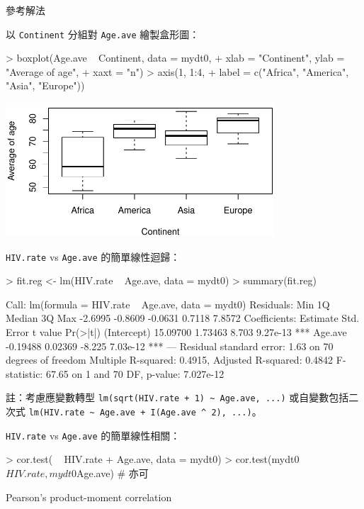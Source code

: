 \documentclass[14pt, aspectratio=43]{beamer}
\begin{document}
\begin{frame}{參考解法}
\framebreak

以 \verb+Continent+ 分組對 \verb+Age.ave+ 繪製盒形圖：
\begin{RC}
> boxplot(Age.ave ~ Continent, data = mydt0,
+         xlab = "Continent", ylab = "Average of age",
+         xaxt = "n")
> axis(1, 1:4, 
+      label = c("Africa", "America", "Asia", "Europe"))
\end{RC}
\begin{center}\includegraphics[width=0.75\textwidth]{Rplot-test-anova.pdf}\end{center}

\verb+HIV.rate+ vs \verb+Age.ave+ 的簡單線性迴歸：
\begin{RC}
> fit.reg <- lm(HIV.rate ~ Age.ave, data = mydt0)
> summary(fit.reg)
\end{RC}
\begin{R}
Call:
lm(formula = HIV.rate ~ Age.ave, data = mydt0)
Residuals:
    Min      1Q  Median      3Q     Max 
-2.6995 -0.8609 -0.0631  0.7118  7.8572 
Coefficients:
            Estimate Std. Error t value Pr(>|t|)    
(Intercept) 15.09700    1.73463   8.703 9.27e-13 ***
Age.ave     -0.19488    0.02369  -8.225 7.03e-12 ***
---
Residual standard error: 1.63 on 70 degrees of freedom
Multiple R-squared:  0.4915,	Adjusted R-squared:  0.4842 
F-statistic: 67.65 on 1 and 70 DF,  p-value: 7.027e-12
\end{R}

\begin{minipage}{1\textwidth}
\tiny 註：考慮應變數轉型 \verb!lm(sqrt(HIV.rate + 1) ~ Age.ave, ...)! 或自變數包括二次式 \verb!lm(HIV.rate ~ Age.ave + I(Age.ave ^ 2), ...)!。
\end{minipage}

\framebreak

\verb+HIV.rate+ vs \verb+Age.ave+ 的簡單線性相關：
\begin{RC}
> cor.test( ~ HIV.rate + Age.ave, data = mydt0)
> cor.test(mydt0$HIV.rate, mydt0$Age.ave)  # 亦可
\end{RC}
\begin{R}
	Pearson's product-moment correlation


\end{R}
\end{frame}
\end{document}

